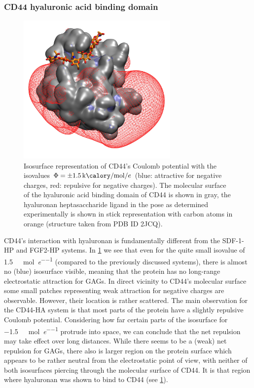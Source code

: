 \subsubsection{CD44 hyaluronic acid binding domain}

\begin{figure}
\centering
\includegraphics[width=0.7\textwidth]{gfx/bspred/2JCQ_isopot500_ligand_view1.jpg}
\caption[]{
Isosurface representation of CD44's Coulomb potential with the isovalues
$\Phi=\pm\SI{1.5}{\kilo\calory\per\mole\per\elementarycharge}$ (blue: attractive
for negative charges, red: repulsive for negative charges). The molecular
surface of the hyaluronic acid binding domain of CD44 is shown in gray, the
hyaluronan heptasaccharide ligand in the pose as determined experimentally is
shown in stick representation with carbon atoms in orange (structure taken from
PDB ID 2JCQ).}
\label{fig:bspred:cd44_estatic}
\end{figure}

CD44's interaction with hyaluronan is fundamentally different from the SDF-1-HP
and FGF2-HP systems. In \cref{fig:bspred:cd44_estatic} we see that even for the
quite small isovalue of \SI{1.5}{\kilo\calory\per\mole\per\elementarycharge}
(compared to the previously discussed systems), there is almost no (blue)
isosurface visible, meaning that the protein has no long-range electrostatic
attraction for GAGs. In direct vicinity to CD44's molecular surface some small
patches representing weak attraction for negative charges are observable.
However, their location is rather scattered. The main observation for the
CD44-HA system is that most parts of the protein have a slightly repulsive
Coulomb potential. Considering how far certain parts of the isosurface for
\SI{-1.5}{\kilo\calory\per\mole\per\elementarycharge} protrude into space, we
can conclude that the net repulsion may take effect over long distances. While
there seems to be a (weak) net repulsion for GAGs, there also is larger region
on the protein surface which appears to be rather neutral from the electrostatic
point of view, with neither of both isosurfaces piercing through the molecular
surface of CD44. It is that region where hyaluronan was shown to bind to CD44
(see \cref{fig:bspred:cd44_estatic}).

